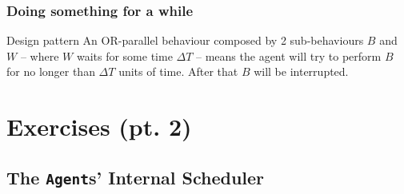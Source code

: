 \documentclass[presentation]{beamer}\mode<presentation>{\usetheme{AMSCesenaPurpleAndGold}}
\begin{document}
%
%
%
%    
%
%
%
%
%
%            
%            
%
%
%

\begin{frame}
    \frametitle{Doing something for a while}

    \begin{block}{Design pattern}
        An OR-parallel behaviour composed by 2 sub-behaviours $B$ and $W$ -- where $W$ waits for some time $\Delta T$ -- means the agent will try to perform $B$ for no longer than $\Delta T$ units of time. After that $B$ will be interrupted.
    \end{block}

    

\end{frame}

\section{Exercises (pt. 2)}

\startExercise

\subsection{The \texttt{Agent}s' Internal Scheduler}
\end{document}
